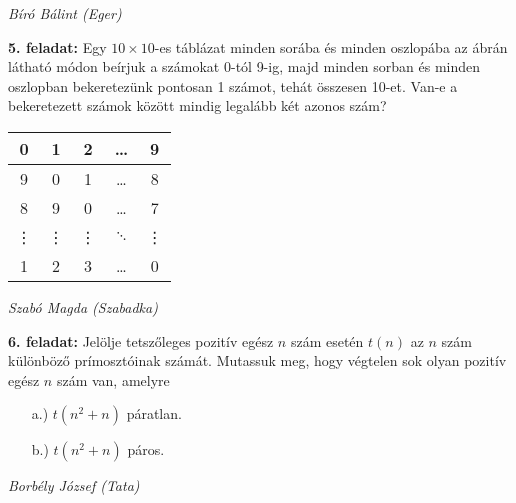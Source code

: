 \documentclass[a4paper,10pt]{article}
\newcommand{\ki}[2]{\hfill {\it #1 (#2)}\medskip}
\begin{document}
\ki{Bíró Bálint}{Eger}\medskip

{\bf 5. feladat: } Egy $10\times10$-es táblázat minden sorába és minden oszlopába az ábrán látható módon beírjuk a számokat 0-tól 9-ig, majd minden sorban és minden oszlopban bekeretezünk pontosan 1 számot, tehát összesen 10-et. Van-e a bekeretezett számok között mindig legalább két azonos szám?
\begin{table}[htbp]
\begin{center}
\begin{tabular}{|c|c|c|c|c|}
\hline
0 & 1 & 2 & \ldots & 9 \\ \hline
9 & 0 & 1 & \ldots & 8 \\ \hline
8 & 9 & 0 & \ldots & 7 \\ \hline
\vdots & \vdots & \vdots & $\ddots$ & \vdots \\ \hline
1 & 2 & 3 & \ldots & 0 \\ \hline
\end{tabular}
\end{center}
\end{table}

\ki{Szabó Magda}{Szabadka}\medskip

\pagebreak
{\bf 6. feladat: } 
Jelölje tetszőleges pozitív egész $n$ szám esetén $t(n)$ az $n$ szám különböző prímosz\-tó\-i\-nak számát. Mutassuk meg, hogy végtelen sok olyan pozitív egész $n$ szám van, amelyre
\begin{itemize}
\item[a.)] $t\left(n^2+n\right)$ páratlan.
\item[b.)] $t\left(n^2+n\right)$ páros.
\end{itemize}

\ki{Borbély József}{Tata}
\end{document}
